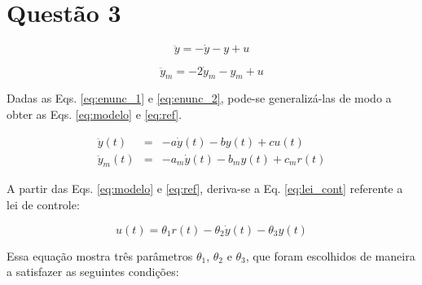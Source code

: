 

\chapter*{Questão 3}

\begin{equation}\label{eq:enunc_1}
\ddot{y} = -\dot{y} - y  + u 
\end{equation}


\begin{equation}\label{eq:enunc_2}
\ddot{y}_m = -2\dot{y}_m - y_m  + u
\end{equation}


\vspace{0.5cm}


\vspace{0.25cm}

Dadas as Eqs. \ref{eq:enunc_1} e \ref{eq:enunc_2}, pode-se generalizá-las de
modo a obter as Eqs. \ref{eq:modelo} e \ref{eq:ref}.

\begin{eqnarray}
\ddot{y}(t) & = &-a\dot{y}(t) - by(t) + cu(t) \label{eq:modelo}\\
\ddot{y}_m(t) & = &-a_m\dot{y}(t) - b_my(t) + c_mr(t) \label{eq:ref}
\end{eqnarray}

A partir das Eqs. \ref{eq:modelo} e \ref{eq:ref}, deriva-se a Eq.
\ref{eq:lei_cont} referente a lei de controle:

\begin{equation}\label{eq:lei_cont}
u(t) = \theta_1r(t) - \theta_2\dot{y}(t) - \theta_3y(t)
\end{equation}

Essa equação mostra três parâmetros $\theta_1$, $\theta_2$ e $\theta_3$, que
foram escolhidos de maneira a satisfazer as seguintes condições:

